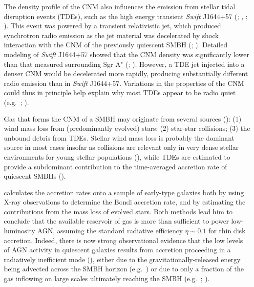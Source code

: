 \documentclass[usenatbib,fleqn]{mn2e}
\begin{document}
The density profile of the CNM also influences the emission from
stellar tidal disruption events (TDEs), such as the high energy
transient {\it Swift} J1644+57 (\citealt{Levan+11};
\citealt{Bloom+11}, \citealt{Burrows+11}; \citealt{Zauderer+11}).
This event was powered by a transient relativistic jet, which produced
synchrotron radio emission as the jet material was decelerated by
shock interaction with the CNM of the previously quiescent SMBH
(\citealt{Giannios&Metzger11}; \citealt{Zauderer+11}).  Detailed
modeling of {\it Swift} J1644+57 showed that the CNM density was
significantly lower than that measured surrounding Sgr A$^{\star}$
(\citealt{Metzger+12}; \citealt{Berger+12}).  However, a TDE jet
injected into a denser CNM would be decelerated more rapidly,
producing substantially different radio emission than in {\it Swift}
J1644+57.  Variations in the properties of the CNM could thus in
principle help explain why most TDEs appear to be radio quiet
(e.g.~\citealt{Bower+13}; \citealt{VanVelzen+13}).

Gas that forms the CNM of a SMBH may originate from several sources
(\citealt{Ho:2009a}): (1) wind mass loss from (predominantly evolved)
stars; (2) star-star collisions; (3) the unbound debris from TDEs.
Stellar wind mass loss is probably the dominant source in most cases
insofar as collisions are relevant only in very dense stellar
environments for young stellar populations (\citealt{Rubin&Loeb11}),
while TDEs are estimated to provide a subdominant contribution to the
time-averaged accretion rate of quiescent SMBHs
(\citealt{MacLeod+13}).

\citet{Ho:2009a} calculates the accretion rates onto a sample of early-type galaxies both by using X-ray observations to determine the Bondi accretion rate, and by estimating the contributions from the mass loss of evolved stars.  Both methods lead him to conclude that the available reservoir of gas is more than sufficient to power low-luminosity AGN, assuming the standard radiative efficiency $\eta \sim 0.1$ for thin disk accretion.  Indeed, there is now strong observational evidence that the low levels of AGN activity in quiescent galaxies results from accretion proceeding in a radiatively inefficient mode (\citealt{Yuan&Narayan14}), either due to the gravitationally-released energy being advected across the SMBH horizon (e.g.~\citealt{Narayan&Yi95}) or due to only a fraction of the gas inflowing on large scales ultimately reaching the SMBH (e.g.~\citealt{Blandford&Begelman99}; \citealt{Li+13}).    
\end{document}
